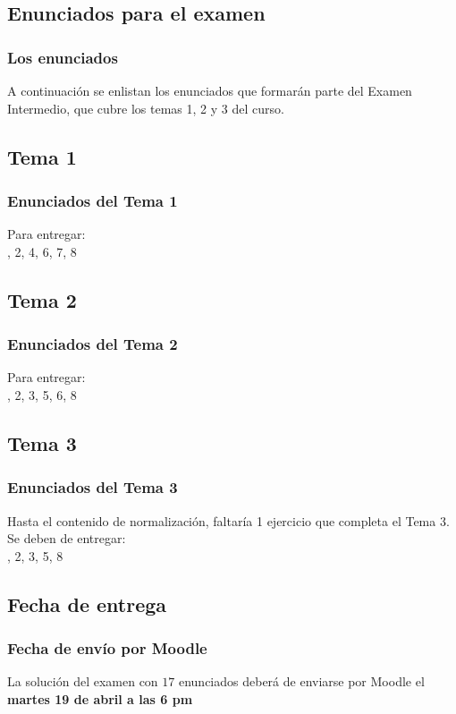 \documentclass[12pt]{beamer}
\begin{document}
\subsection{Enunciados para el examen}

\begin{frame}
\frametitle{Los enunciados}
A continuación se enlistan los enunciados que formarán parte del Examen Intermedio, que cubre los temas 1, 2 y 3 del curso.
\end{frame}

\subsection{Tema 1}

\begin{frame}
\frametitle{Enunciados del Tema 1}
Para entregar:
\\
\bigskip
{}, 2, 4, 6, 7, 8
\end{frame}

\subsection{Tema 2}

\begin{frame}
\frametitle{Enunciados del Tema 2}
Para entregar:
\\
\bigskip
{}, 2, 3, 5, 6, 8
\end{frame}

\subsection{Tema 3}

\begin{frame}
\frametitle{Enunciados del Tema 3}
Hasta el contenido de normalización, faltaría 1 ejercicio que completa el Tema 3. 
\\
\bigskip
\pause
Se deben de entregar:
\\
\bigskip
{}, 2, 3, 5, 8
\end{frame}

\subsection{Fecha de entrega}

\begin{frame}
\frametitle{Fecha de envío por Moodle}
La solución del examen con $17$ enunciados deberá de enviarse por Moodle el \textbf{martes 19 de abril a las 6 pm}
\end{frame}
\end{document}
